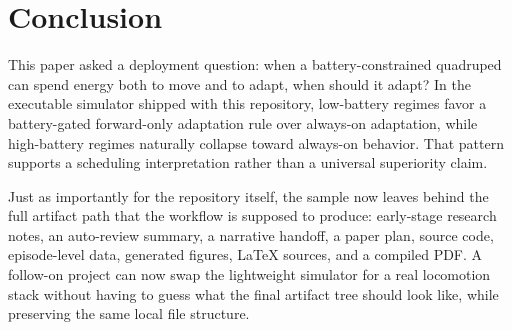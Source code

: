 \section{Conclusion}

This paper asked a deployment question: when a battery-constrained quadruped can spend energy both to move and to adapt, when should it adapt? In the executable simulator shipped with this repository, low-battery regimes favor a battery-gated forward-only adaptation rule over always-on adaptation, while high-battery regimes naturally collapse toward always-on behavior. That pattern supports a scheduling interpretation rather than a universal superiority claim.

Just as importantly for the repository itself, the sample now leaves behind the full artifact path that the workflow is supposed to produce: early-stage research notes, an auto-review summary, a narrative handoff, a paper plan, source code, episode-level data, generated figures, LaTeX sources, and a compiled PDF. A follow-on project can now swap the lightweight simulator for a real locomotion stack without having to guess what the final artifact tree should look like, while preserving the same local file structure.
